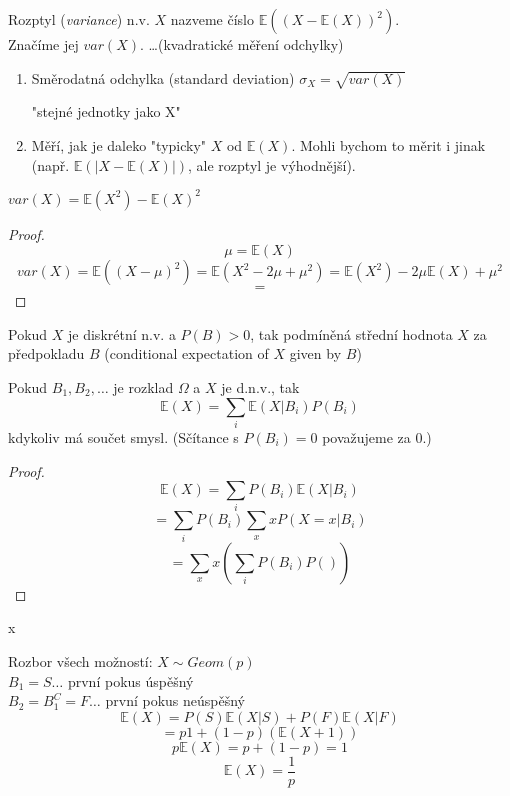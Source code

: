 \documentclass[../main.tex]{subfiles}
\begin{document}
\begin{definition}[Rozptyl]
    Rozptyl (\textit{variance}) n.v. $X$ nazveme číslo $\mathbb{E}((X-\mathbb{E}(X))^2)$.\\
    Značíme jej $var(X)$. \dots (kvadratické měření odchylky)
    \begin{enumerate}
        \item Směrodatná odchylka (standard deviation) $\sigma_X = \sqrt{var(X)}$
        \begin{remark}
            "stejné jednotky jako X"
        \end{remark}
        \item Měří, jak je daleko "typicky" $X$ od $\mathbb{E}(X)$. Mohli bychom to měrit i jinak 
        (např. $\mathbb{E}(|X-\mathbb{E}(X)|)$, ale rozptyl je výhodnější).
    \end{enumerate}
\end{definition}

\begin{theorem}
    $var(X) = \mathbb{E}(X^2) - \mathbb{E}(X)^2$
\end{theorem}
\begin{proof}
    \[\mu = \mathbb{E}(X)\]
    \[var(X) = \mathbb{E}((X - \mu)^2) = \mathbb{E}(X^2-2\mu + \mu^2) = \mathbb{E}(X^2) - 2\mu \mathbb{E}(X) + \mu^2\]
    \[ = \] %
\end{proof}

\begin{definition}
    Pokud $X$ je diskrétní n.v. a $P(B) > 0$, tak podmíněná střední hodnota 
    $X$ za předpokladu $B$ (conditional expectation of $X$ given by $B$)
\end{definition}

\begin{theorem}
    Pokud $B_1,B_2,\dots$ je rozklad $\Omega$ a $X$ je d.n.v., tak
    \[\mathbb{E}(X) = \sum_i \mathbb{E}(X | B_i) P(B_i)\]
    kdykoliv má součet smysl. (Sčítance s $P(B_i) = 0$ považujeme za 0.)
\end{theorem}
\begin{proof}
    \[\mathbb{E}(X) = \sum_i P(B_i)\mathbb{E}(X | B_i)\]
    \[= \sum_i P(B_i) \sum_x xP(X=x | B_i)\]
    \[= \sum_x x (\sum_i P(B_i)P())\]
\end{proof}

\begin{remark} {\color{white} x}

    \noindent
    Rozbor všech možností:
    $X \sim Geom(p)$\\
    $B_1 = S \dots$ první pokus úspěšný\\
    $B_2 = B^C_1 = F \dots$ první pokus neúspěšný\\
    \[\mathbb{E}(X) = P(S)\mathbb{E}(X|S) + P(F)\mathbb{E}(X|F)\]
    \[= p1 + (1-p)(\mathbb{E}(X+1))\]
    \[p\mathbb{E}(X) = p + (1-p) = 1\]
    \[\mathbb{E}(X) = \frac{1}{p}\]
\end{remark}
\end{document}
